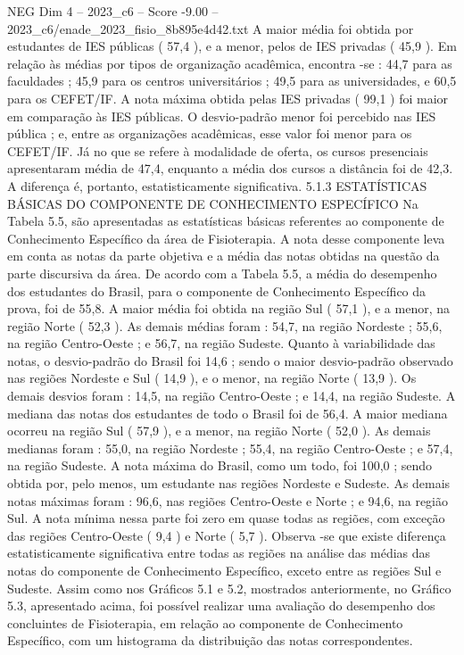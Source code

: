 \begin{textsample}{NEG Dim 4 – 2023\_c6 – Score -9.00 – 2023\_c6/enade\_2023\_fisio\_8b895e4d42.txt}
A maior média foi obtida por estudantes de IES públicas ( 57,4 ), e a menor, pelos de IES privadas ( 45,9 ).
Em relação às médias por tipos de organização acadêmica, encontra -se : 44,7 para as faculdades ; 45,9 para os centros universitários ; 49,5 para as universidades, e 60,5 para os CEFET/IF.
A nota máxima obtida pelas IES privadas ( 99,1 ) foi maior em comparação às IES públicas.
O desvio-padrão menor foi percebido nas IES pública ; e, entre as organizações acadêmicas, esse valor foi menor para os CEFET/IF.
Já no que se refere à modalidade de oferta, os cursos presenciais apresentaram média de 47,4, enquanto a média dos cursos a distância foi de 42,3.
A diferença é, portanto, estatisticamente significativa. 5.1.3 ESTATÍSTICAS BÁSICAS DO COMPONENTE DE CONHECIMENTO ESPECÍFICO Na Tabela 5.5, são apresentadas as estatísticas básicas referentes ao componente de Conhecimento Específico da área de Fisioterapia.
A nota desse componente leva em conta as notas da parte objetiva e a média das notas obtidas na questão da parte discursiva da área.
De acordo com a Tabela 5.5, a média do desempenho dos estudantes do Brasil, para o componente de Conhecimento Específico da prova, foi de 55,8.
A maior média foi obtida na região Sul ( 57,1 ), e a menor, na região Norte ( 52,3 ).
As demais médias foram : 54,7, na região Nordeste ; 55,6, na região Centro-Oeste ; e 56,7, na região Sudeste.
Quanto à variabilidade das notas, o desvio-padrão do Brasil foi 14,6 ; sendo o maior desvio-padrão observado nas regiões Nordeste e Sul ( 14,9 ), e o menor, na região Norte ( 13,9 ).
Os demais desvios foram : 14,5, na região Centro-Oeste ; e 14,4, na região Sudeste.
A mediana das notas dos estudantes de todo o Brasil foi de 56,4.
A maior mediana ocorreu na região Sul ( 57,9 ), e a menor, na região Norte ( 52,0 ).
As demais medianas foram : 55,0, na região Nordeste ; 55,4, na região Centro-Oeste ; e 57,4, na região Sudeste.
A nota máxima do Brasil, como um todo, foi 100,0 ; sendo obtida por, pelo menos, um estudante nas regiões Nordeste e Sudeste.
As demais notas máximas foram : 96,6, nas regiões Centro-Oeste e Norte ; e 94,6, na região Sul.
A nota mínima nessa parte foi zero em quase todas as regiões, com exceção das regiões Centro-Oeste ( 9,4 ) e Norte ( 5,7 ).
Observa -se que existe diferença estatisticamente significativa entre todas as regiões na análise das médias das notas do componente de Conhecimento Específico, exceto entre as regiões Sul e Sudeste.
Assim como nos Gráficos 5.1 e 5.2, mostrados anteriormente, no Gráfico 5.3, apresentado acima, foi possível realizar uma avaliação do desempenho dos concluintes de Fisioterapia, em relação ao componente de Conhecimento Específico, com um histograma da distribuição das notas correspondentes.

\end{textsample}
